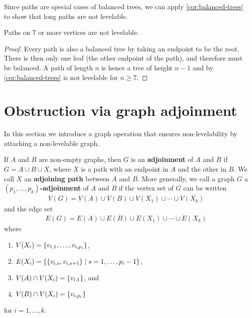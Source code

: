 \noindent
Since paths are special cases of balanced trees, we can apply \autoref{cor:balanced-trees} to show that long paths are not levelable.

\begin{corollary} \label{cor:long-paths}
Paths on 7 or more vertices are not levelable.
\end{corollary}
\begin{proof}
Every path is also a balanced tree by taking an endpoint to be the root. There is then only one leaf (the other endpoint of the path), and therefore must be balanced. A path of length $n$ is hence a tree of height $n-1$ and by \autoref{cor:balanced-trees} is not levelable for $n \geq 7$.
\end{proof}

\section{Obstruction via graph adjoinment} \label{sec:adjoinment}

In this section we introduce a graph operation that ensures non-levelability by attaching a non-levelable graph.

\begin{definition}
If $A$ and $B$ are non-empty graphs, then $G$ is an \textbf{adjoinment} of $A$ and $B$ if $G = A\cup B \cup X$, where $X$ is a path with an endpoint in $A$ and the other in $B$. We call $X$ an \textbf{adjoining path} between $A$ and $B$. More generally, we call a graph $G$ a \textbf{$(p_1, \dots, p_k)$-adjoinment} of $A$ and $B$ if the vertex set of $G$ can be written 
\begin{equation*}
\begin{aligned}
V(G) = V(A)
\cup V(B) 
\cup V(X_1) \cup \cdots \cup V(X_k)
\end{aligned}
\end{equation*}
and the edge set 
\begin{equation*}
\begin{aligned}
E(G) =  E(A) \cup E(B) \cup E(X_1) \cup \cdots \cup E(X_k) 
\end{aligned}
\end{equation*}
where 
\begin{enumerate}
\item $V(X_i) = \{ v_{i, 1}, \dots, v_{i, p_i} \}$,
\item $E(X_i) = \{ \{ v_{i, s}, v_{i, s+1} \} \; | \; s = 1, \dots, p_{i} - 1  \}$,
\item $V(A) \cap V(X_i) = \{ v_{i, 1} \}$, and
\item $V(B) \cap V(X_i) = \{ v_{i, p_i} \}$ 
\end{enumerate}
for $i = 1, \dots, k$. 
\end{definition}

